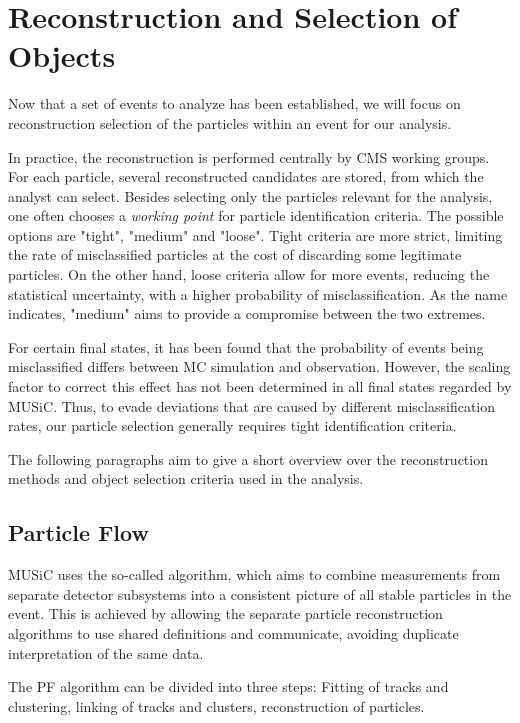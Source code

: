 \section{Reconstruction and Selection of Objects}
\label{sec:reconstruction}

Now that a set of events to analyze has been established, we will focus on reconstruction selection of the particles within an event for our analysis. 

In practice, the reconstruction is performed centrally by \ac{CMS} working groups. For each particle, several reconstructed candidates are stored, from which the analyst can select. 
Besides selecting only the particles relevant for the analysis, one often chooses a \emph{working point} for particle identification criteria. The possible options are "tight", "medium" and "loose". Tight criteria are more strict, limiting the rate of misclassified particles at the cost of discarding some legitimate particles. On the other hand, loose criteria allow for more events, reducing the statistical uncertainty, with a higher probability of misclassification. As the name indicates, "medium" aims to provide a compromise between the two extremes.

For certain final states, it has been found that the probability of events being misclassified differs between \ac{MC} simulation and observation. However, the scaling factor to correct this effect has not been determined in all final states regarded by \ac{MUSiC}. Thus, to evade deviations that are caused by different misclassification rates, our particle selection generally requires tight identification criteria.

The following paragraphs aim to give a short overview over the reconstruction methods and object selection criteria used in the analysis. 

\subsection{Particle Flow}
\ac{MUSiC} uses the so-called  algorithm\cite{CMS:CMS-PAS-PFT-09-001}, which aims to combine measurements from separate detector subsystems into a consistent picture of all stable particles in the event. This is achieved by allowing the separate particle reconstruction algorithms to use shared definitions and communicate, avoiding duplicate interpretation of the same data.

The \ac{PF} algorithm can be divided into three steps: Fitting of tracks and clustering, linking of tracks and clusters, reconstruction of particles.

